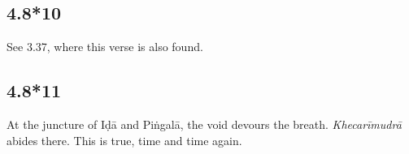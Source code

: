 \begin{ekdosis}
\subsection*{4.8*10}






\begin{philcomm}[hp04_008_10]
See 3.37, where this verse is also found.
\end{philcomm}

\subsection*{4.8*11}
\begin{translation}[hp04_008_11]
At the juncture of Iḍā and Piṅgalā, the void devours the breath. \emph{Khecarīmudrā} abides there. This is true, time and time again.
\end{translation}


\end{ekdosis}
